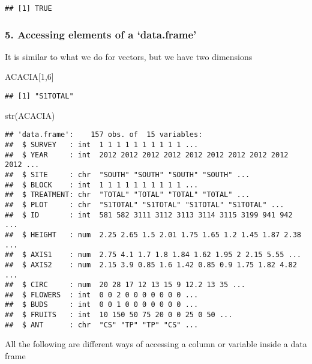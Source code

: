 \documentclass[
]{article}
\newenvironment{Shaded}{\begin{snugshade}}{\end{snugshade}}
\newcommand{\DecValTok}[1]{\textcolor[rgb]{0.00,0.00,0.81}{#1}}
\newcommand{\FunctionTok}[1]{\textcolor[rgb]{0.00,0.00,0.00}{#1}}
\newcommand{\NormalTok}[1]{#1}
\begin{document}
\begin{verbatim}
## [1] TRUE
\end{verbatim}

\hypertarget{accessing-elements-of-a-data.frame}{%
\subsubsection{5. Accessing elements of a
`data.frame'}\label{accessing-elements-of-a-data.frame}}

It is similar to what we do for vectors, but we have two dimensions

\begin{Shaded}
\begin{Highlighting}[]
\NormalTok{ACACIA[}\DecValTok{1}\NormalTok{,}\DecValTok{6}\NormalTok{]}
\end{Highlighting}
\end{Shaded}

\begin{verbatim}
## [1] "S1TOTAL"
\end{verbatim}

\begin{Shaded}
\begin{Highlighting}[]
\FunctionTok{str}\NormalTok{(ACACIA)}
\end{Highlighting}
\end{Shaded}

\begin{verbatim}
## 'data.frame':    157 obs. of  15 variables:
##  $ SURVEY   : int  1 1 1 1 1 1 1 1 1 1 ...
##  $ YEAR     : int  2012 2012 2012 2012 2012 2012 2012 2012 2012 2012 ...
##  $ SITE     : chr  "SOUTH" "SOUTH" "SOUTH" "SOUTH" ...
##  $ BLOCK    : int  1 1 1 1 1 1 1 1 1 1 ...
##  $ TREATMENT: chr  "TOTAL" "TOTAL" "TOTAL" "TOTAL" ...
##  $ PLOT     : chr  "S1TOTAL" "S1TOTAL" "S1TOTAL" "S1TOTAL" ...
##  $ ID       : int  581 582 3111 3112 3113 3114 3115 3199 941 942 ...
##  $ HEIGHT   : num  2.25 2.65 1.5 2.01 1.75 1.65 1.2 1.45 1.87 2.38 ...
##  $ AXIS1    : num  2.75 4.1 1.7 1.8 1.84 1.62 1.95 2 2.15 5.55 ...
##  $ AXIS2    : num  2.15 3.9 0.85 1.6 1.42 0.85 0.9 1.75 1.82 4.82 ...
##  $ CIRC     : num  20 28 17 12 13 15 9 12.2 13 35 ...
##  $ FLOWERS  : int  0 0 2 0 0 0 0 0 0 0 ...
##  $ BUDS     : int  0 0 1 0 0 0 0 0 0 0 ...
##  $ FRUITS   : int  10 150 50 75 20 0 0 25 0 50 ...
##  $ ANT      : chr  "CS" "TP" "TP" "CS" ...
\end{verbatim}

All the following are different ways of accessing a column or variable
inside a data frame
\end{document}
